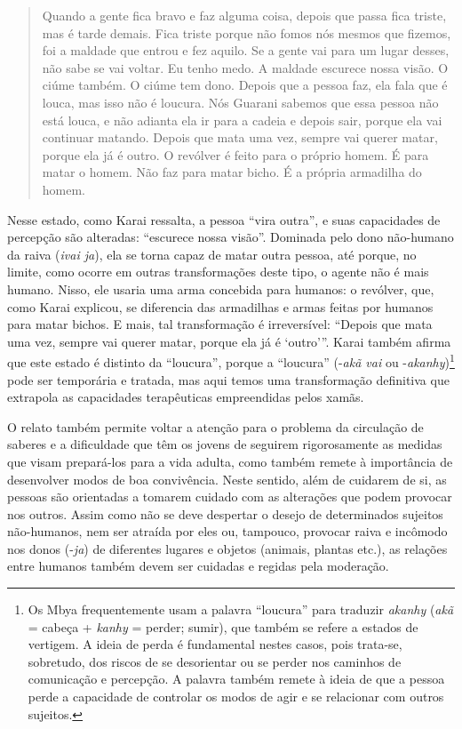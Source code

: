 \begin{quotation}
\noindent
Quando a gente fica bravo e faz alguma coisa, depois que passa fica
triste, mas é tarde demais. Fica triste porque não fomos nós mesmos que
fizemos, foi a maldade que entrou e fez aquilo. Se a gente vai para um
lugar desses, não sabe se vai voltar. Eu tenho medo. A maldade escurece
nossa visão. O ciúme também. O ciúme tem dono. Depois que a pessoa faz,
ela fala que é louca, mas isso não é loucura. Nós Guarani sabemos que
essa pessoa não está louca, e não adianta ela ir para a cadeia e depois
sair, porque ela vai continuar matando. Depois que mata uma vez, sempre
vai querer matar, porque ela já é outro. O revólver é feito para o
próprio homem. É para matar o homem. Não faz para matar bicho. É a
própria armadilha do homem.

\end{quotation}
Nesse estado, como Karai ressalta, a pessoa ``vira outra'', e suas
capacidades de percepção são alteradas: ``escurece nossa visão''.
Dominada pelo dono não-humano da raiva (\emph{ivai ja}), ela se torna capaz de
matar outra pessoa, até porque, no limite, como ocorre em outras
transformações deste tipo, o agente não é mais humano. Nisso, ele
usaria uma arma concebida para humanos: o revólver, que, como Karai
explicou, se diferencia das armadilhas e armas feitas por humanos para
matar bichos. E mais, tal transformação é irreversível: ``Depois que
mata uma vez, sempre vai querer matar, porque ela já é ‘outro’''. Karai
também afirma que este estado é distinto da ``loucura'', porque a
``loucura'' (-\emph{akã vai} ou -\emph{akanhy})\footnote{Os Mbya frequentemente usam
a palavra ``loucura'' para traduzir \emph{akanhy} (\emph{akã} = cabeça + \emph{kanhy} =
perder; sumir), que também se refere a estados de vertigem. A ideia de
perda é fundamental nestes casos, pois trata-se, sobretudo, dos riscos
de se desorientar ou se perder nos caminhos de comunicação e percepção.
A palavra também remete à ideia de que a pessoa perde a capacidade de
controlar os modos de agir e se relacionar com outros sujeitos.} pode
ser temporária e tratada, mas aqui temos uma transformação definitiva
que extrapola as capacidades terapêuticas empreendidas pelos xamãs. 

O relato também permite voltar a atenção para o problema da circulação
de saberes e a dificuldade que têm os jovens de seguirem rigorosamente
as medidas que visam prepará-los para a vida adulta, como também remete
à importância de desenvolver modos de boa convivência. Neste sentido,
além de cuidarem de si, as pessoas são orientadas a tomarem cuidado com
as alterações que podem provocar nos outros. Assim como não se deve
despertar o desejo de determinados sujeitos não-humanos, nem ser
atraída por eles ou, tampouco, provocar raiva e incômodo nos donos
(-\emph{ja}) de diferentes lugares e objetos (animais, plantas etc.), as
relações entre humanos também devem ser cuidadas e regidas pela
moderação. 

